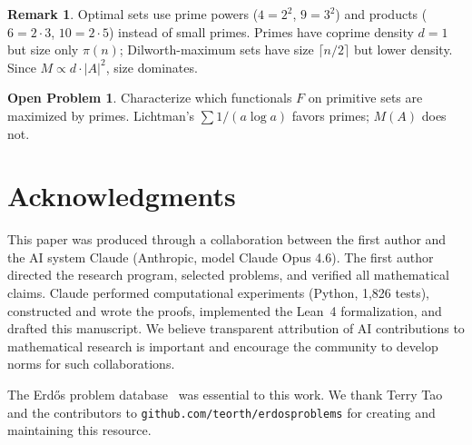 \documentclass[11pt]{article}
\theoremstyle{plain}
\theoremstyle{definition}
\newtheorem{problem}[theorem]{Open Problem}
\newtheorem{remark}[theorem]{Remark}
\begin{document}
\begin{remark}\label{rem:structure}
Optimal sets use prime powers ($4=2^2$, $9=3^2$) and products
($6=2\cdot 3$, $10=2\cdot 5$) instead of small primes.
Primes have coprime density $d=1$ but size only $\pi(n)$;
Dilworth-maximum sets have size $\lceil n/2\rceil$ but lower density.
Since $M\propto d\cdot|A|^2$, size dominates.
\end{remark}

\begin{problem}\label{prob:func}
Characterize which functionals $F$ on primitive sets are maximized by
primes. Lichtman's $\sum 1/(a\log a)$ favors primes; $M(A)$ does not.
\end{problem}

\section*{Acknowledgments}

This paper was produced through a collaboration between the first
author and the AI system Claude (Anthropic, model Claude Opus 4.6).
The first author directed the research program, selected problems,
and verified all mathematical claims. Claude performed computational
experiments (Python, 1{,}826 tests), constructed and wrote the proofs,
implemented the Lean~4 formalization, and drafted this manuscript.
We believe transparent attribution of AI contributions to mathematical
research is important and encourage the community to develop norms
for such collaborations.

The Erd\H{o}s problem database~\cite{tao2025erdos} was essential to
this work. We thank Terry Tao and the contributors to
\texttt{github.com/teorth/erdosproblems} for creating and maintaining
this resource.
\end{document}
